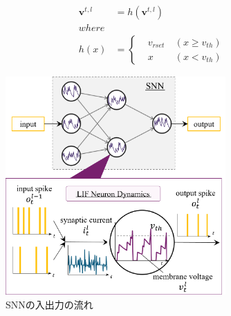   \begin{equation}
    \begin{split}
      \bm{v}^{t, l}&=h\left(\bm{v}^{t, l}\right)\\
    where\\
    h\left(x\right)&=\left\{
      \begin{alignedat}{2}
        &v_{rset} &\:\left(x{\geq}v_{th}\right)\\
        &x &\:\left(x{<}v_{th}\right)
      \end{alignedat}
    \right. 
    \end{split} \label{eq:outputSpike2}
  \end{equation}


\begin{figure}[htb]
    \centering
    \includegraphics[width=0.75\textwidth]{Static/chap2_sec1_snn.png}
    \caption{SNNの入出力の流れ}
    \label{fig:snn:inoutflow}
\end{figure}
